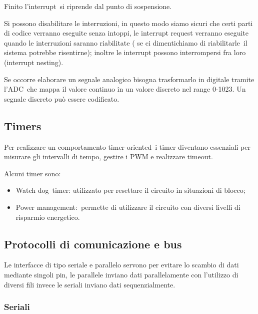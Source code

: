 \documentclass[
]{article}
\providecommand{\tightlist}{%
  \setlength{\itemsep}{0pt}\setlength{\parskip}{0pt}}
\begin{document}
{Finito }{l'interrupt}{~si riprende dal punto di sospensione.}

{Si possono disabilitare le interruzioni, in questo modo siamo sicuri
che certi parti di codice verranno eseguite senza intoppi, le interrupt
request verranno eseguite quando le interruzioni saranno riabilitate (
se ci dimentichiamo di }{riabilitarle}{~il sistema potrebbe risentirne);
inoltre le interrupt possono interrompersi fra loro (interrupt
nesting).}

{}

{Se occorre elaborare un segnale analogico bisogna trasformarlo in
digitale tramite l'}{ADC}{~che mappa il valore continuo in un valore
discreto nel range 0-1023. Un segnale discreto può essere codificato.}

{}

{}

\subsection{\texorpdfstring{{Timers}}{Timers}}\label{h.y32cw7gzn0ff}

{Per realizzare un comportamento }{timer-oriented}{~i timer diventano
essenziali per misurare gli intervalli di tempo, gestire i PWM e
realizzare timeout.}

{Alcuni timer sono:}

\begin{itemize}
\tightlist
\item
  {Watch dog}{~timer}{: utilizzato per resettare il circuito in
  situazioni di blocco;}
\item
  {Power management:}{~permette di utilizzare il circuito con diversi
  livelli di risparmio energetico.}
\end{itemize}

{}

{}

\subsection{\texorpdfstring{{Protocolli di comunicazione e
bus}}{Protocolli di comunicazione e bus}}\label{h.fgbgjuderif6}

{Le interfacce di tipo seriale e parallelo servono per evitare lo
scambio di dati mediante singoli pin, le parallele inviano dati
parallelamente con l'utilizzo di diversi fili invece le seriali inviano
dati sequenzialmente.}

{}

\subsubsection{\texorpdfstring{{Seriali}}{Seriali}}\label{h.3l4skvdx7q2m}
\end{document}
